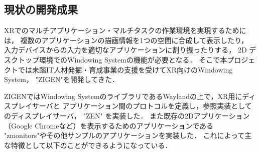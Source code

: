 \subsection{現状の開発成果}
\label{section:current-status}

XRでのマルチアプリケーション・マルチタスクの作業環境を実現するためには，
複数のアプリケーションの描画情報を1つの空間に合成して表示したり，
入力デバイスからの入力を適切なアプリケーションに割り振ったりする，
2D デスクトップ環境でのWindowing Systemの機能が必要となる．
そこで本プロジェクトでは未踏IT人材発掘・育成事業の支援を受けてXR向けのWindowing System，
"ZIGEN"を開発してきた．

ZIGENではWindowing SystemのライブラリであるWaylandの上で，XR用にディスプレイサーバと
アプリケーション間のプロトコルを定義し，参照実装としてのディスプレイサーバ， "ZEN" を実装した．
また既存の2Dアプリケーション（Google Chromeなど）を表示するためのアプリケーションである
"zmonitors"やその他サンプルのアプリケーションを実装した．
これによって主な特徴として以下のことができるようになっている．

